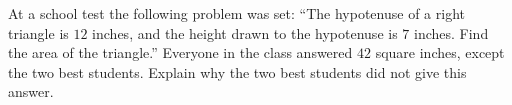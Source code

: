 At a school test the following problem was set: ``The hypotenuse of a right triangle is $12$ inches, and the height drawn to the hypotenuse is $7$ inches. Find the area of the triangle.'' Everyone in the class answered $42$ square inches, except the two best students. Explain why the two best students did not give this answer.
